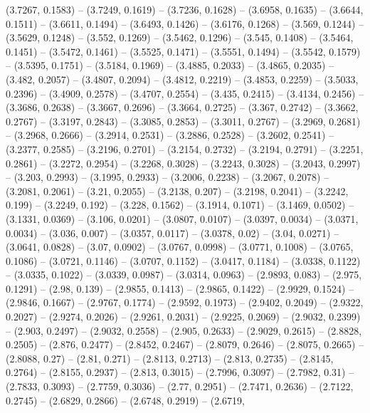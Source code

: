 {  (3.7267, 0.1583) -- (3.7249, 0.1619) -- (3.7236, 0.1628) -- (3.6958, 0.1635) 
  -- (3.6644, 0.1511) -- (3.6611, 0.1494) -- (3.6493, 0.1426) -- (3.6176, 
  0.1268) -- (3.569, 0.1244) -- (3.5629, 0.1248) -- (3.552, 0.1269) -- (3.5462, 
  0.1296) -- (3.545, 0.1408) -- (3.5464, 0.1451) -- (3.5472, 0.1461) -- (3.5525,
   0.1471) -- (3.5551, 0.1494) -- (3.5542, 0.1579) -- (3.5395, 0.1751) -- 
  (3.5184, 0.1969) -- (3.4885, 0.2033) -- (3.4865, 0.2035) -- (3.482, 0.2057) --
   (3.4807, 0.2094) -- (3.4812, 0.2219) -- (3.4853, 0.2259) -- (3.5033, 0.2396) 
  -- (3.4909, 0.2578) -- (3.4707, 0.2554) -- (3.435, 0.2415) -- (3.4134, 0.2456)
   -- (3.3686, 0.2638) -- (3.3667, 0.2696) -- (3.3664, 0.2725) -- (3.367, 
  0.2742) -- (3.3662, 0.2767) -- (3.3197, 0.2843) -- (3.3085, 0.2853) -- 
  (3.3011, 0.2767) -- (3.2969, 0.2681) -- (3.2968, 0.2666) -- (3.2914, 0.2531) 
  -- (3.2886, 0.2528) -- (3.2602, 0.2541) -- (3.2377, 0.2585) -- (3.2196, 
  0.2701) -- (3.2154, 0.2732) -- (3.2194, 0.2791) -- (3.2251, 0.2861) -- 
  (3.2272, 0.2954) -- (3.2268, 0.3028) -- (3.2243, 0.3028) -- (3.2043, 0.2997) 
  -- (3.203, 0.2993) -- (3.1995, 0.2933) -- (3.2006, 0.2238) -- (3.2067, 0.2078)
   -- (3.2081, 0.2061) -- (3.21, 0.2055) -- (3.2138, 0.207) -- (3.2198, 0.2041) 
  -- (3.2242, 0.199) -- (3.2249, 0.192) -- (3.228, 0.1562) -- (3.1914, 0.1071) 
  -- (3.1469, 0.0502) -- (3.1331, 0.0369) -- (3.106, 0.0201) -- (3.0807, 0.0107)
   -- (3.0397, 0.0034) -- (3.0371, 0.0034) -- (3.036, 0.007) -- (3.0357, 0.0117)
   -- (3.0378, 0.02) -- (3.04, 0.0271) -- (3.0641, 0.0828) -- (3.07, 0.0902) -- 
  (3.0767, 0.0998) -- (3.0771, 0.1008) -- (3.0765, 0.1086) -- (3.0721, 0.1146) 
  -- (3.0707, 0.1152) -- (3.0417, 0.1184) -- (3.0338, 0.1122) -- (3.0335, 
  0.1022) -- (3.0339, 0.0987) -- (3.0314, 0.0963) -- (2.9893, 0.083) -- (2.975, 
  0.1291) -- (2.98, 0.139) -- (2.9855, 0.1413) -- (2.9865, 0.1422) -- (2.9929, 
  0.1524) -- (2.9846, 0.1667) -- (2.9767, 0.1774) -- (2.9592, 0.1973) -- 
  (2.9402, 0.2049) -- (2.9322, 0.2027) -- (2.9274, 0.2026) -- (2.9261, 0.2031) 
  -- (2.9225, 0.2069) -- (2.9032, 0.2399) -- (2.903, 0.2497) -- (2.9032, 0.2558)
   -- (2.905, 0.2633) -- (2.9029, 0.2615) -- (2.8828, 0.2505) -- (2.876, 0.2477)
   -- (2.8452, 0.2467) -- (2.8079, 0.2646) -- (2.8075, 0.2665) -- (2.8088, 0.27)
   -- (2.81, 0.271) -- (2.8113, 0.2713) -- (2.813, 0.2735) -- (2.8145, 0.2764) 
  -- (2.8155, 0.2937) -- (2.813, 0.3015) -- (2.7996, 0.3097) -- (2.7982, 0.31) 
  -- (2.7833, 0.3093) -- (2.7759, 0.3036) -- (2.77, 0.2951) -- (2.7471, 0.2636) 
  -- (2.7122, 0.2745) -- (2.6829, 0.2866) -- (2.6748, 0.2919) -- (2.6719, 
}
